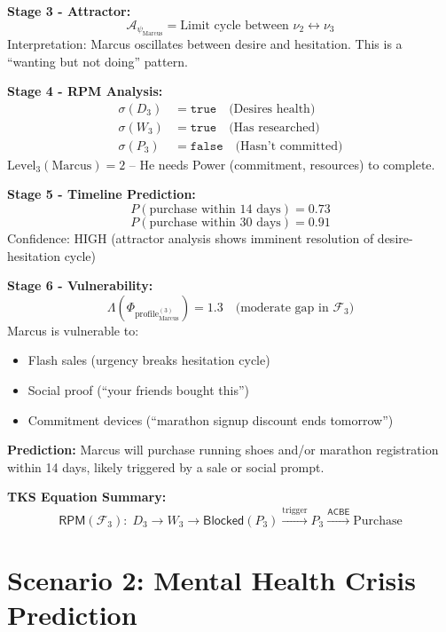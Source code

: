 \documentclass[11pt,twoside]{book}
\newcommand{\noe}[1]{\nu_{#1}}
\newcommand{\Foundations}{\mathcal{F}}
\newcommand{\RPM}{\mathsf{RPM}}
\newcommand{\ACBE}{\mathsf{ACBE}}
\newcommand{\Lacunarity}{\Lambda}
\newcommand{\PsychAttractor}{\mathcal{A}_\psi}
\newcommand{\ProfileFrac}{\Phi_{\mathrm{profile}}}
\begin{document}
\begin{tcolorbox}[colback=yellow!5!white,colframe=yellow!65!black,title=\textbf{Scenario: Predicting Marcus's Next Purchase},breakable]
\textbf{Stage 3 - Attractor:}
\[
    \PsychAttractor_{\text{Marcus}} = \text{Limit cycle between } \noe{2} \leftrightarrow \noe{3}
\]
Interpretation: Marcus oscillates between desire and hesitation. This is a ``wanting but not doing'' pattern.

\textbf{Stage 4 - RPM Analysis:}
\begin{align*}
    \sigma(D_3) &= \mathtt{true} \quad \text{(Desires health)} \\
    \sigma(W_3) &= \mathtt{true} \quad \text{(Has researched)} \\
    \sigma(P_3) &= \mathtt{false} \quad \text{(Hasn't committed)}
\end{align*}
$\mathrm{Level}_3(\text{Marcus}) = 2$ -- He needs Power (commitment, resources) to complete.

\textbf{Stage 5 - Timeline Prediction:}
\[
    P(\text{purchase within 14 days}) = 0.73
\]
\[
    P(\text{purchase within 30 days}) = 0.91
\]
Confidence: HIGH (attractor analysis shows imminent resolution of desire-hesitation cycle)

\textbf{Stage 6 - Vulnerability:}
\[
    \Lacunarity(\ProfileFrac_{\text{Marcus}}^{(3)}) = 1.3 \quad \text{(moderate gap in } \Foundations_3 \text{)}
\]
Marcus is vulnerable to:
\begin{itemize}
    \item Flash sales (urgency breaks hesitation cycle)
    \item Social proof (``your friends bought this'')
    \item Commitment devices (``marathon signup discount ends tomorrow'')
\end{itemize}

\textbf{Prediction:} Marcus will purchase running shoes and/or marathon registration within 14 days, likely triggered by a sale or social prompt.

\textbf{TKS Equation Summary:}
\begin{equation}
\boxed{
    \RPM(\Foundations_3) : \; D_3 \to W_3 \to \mathsf{Blocked}(P_3) \xrightarrow{\text{trigger}} P_3 \xrightarrow{\ACBE} \text{Purchase}
}
\end{equation}

\end{tcolorbox}

\chapter{Scenario 2: Mental Health Crisis Prediction}
\label{ch:scenario-mental-health}
\end{document}
